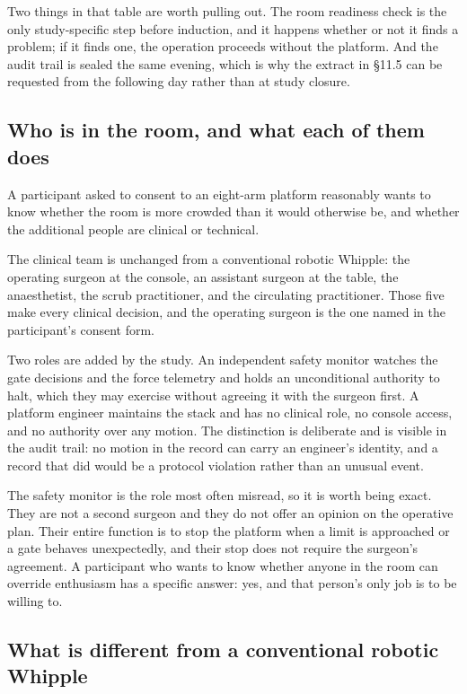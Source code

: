 \vspace{0.30em}

\noindent Two things in that table are worth pulling out. The room readiness
check is the only study-specific step before induction, and it happens whether
or not it finds a problem; if it finds one, the operation proceeds without the
platform. And the audit trail is sealed the same evening, which is why the
extract in \S 11.5 can be requested from the following day rather than at study
closure.

\subsection{Who is in the room, and what each of them does}

A participant asked to consent to an eight-arm platform reasonably wants to know
whether the room is more crowded than it would otherwise be, and whether the
additional people are clinical or technical.

The clinical team is unchanged from a conventional robotic Whipple: the
operating surgeon at the console, an assistant surgeon at the table, the
anaesthetist, the scrub practitioner, and the circulating practitioner. Those
five make every clinical decision, and the operating surgeon is the one named in
the participant's consent form.

Two roles are added by the study. An independent safety monitor watches the gate
decisions and the force telemetry and holds an unconditional authority to halt,
which they may exercise without agreeing it with the surgeon first. A platform
engineer maintains the stack and has no clinical role, no console access, and no
authority over any motion. The distinction is deliberate and is visible in the
audit trail: no motion in the record can carry an engineer's identity, and a
record that did would be a protocol violation rather than an unusual event.

The safety monitor is the role most often misread, so it is worth being exact.
They are not a second surgeon and they do not offer an opinion on the operative
plan. Their entire function is to stop the platform when a limit is approached
or a gate behaves unexpectedly, and their stop does not require the surgeon's
agreement. A participant who wants to know whether anyone in the room can
override enthusiasm has a specific answer: yes, and that person's only job is
to be willing to.

\subsection{What is different from a conventional robotic Whipple}

